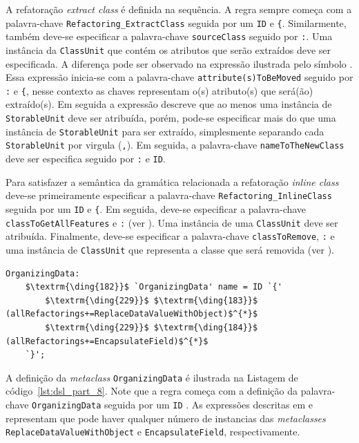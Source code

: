 A refatoração \textit{extract class} é definida na sequência. A regra sempre começa com a palavra-chave \texttt{Refactoring\_ExtractClass} seguida por um \texttt{ID} e \texttt{\{}. Similarmente, também deve-se especificar a palavra-chave \texttt{sourceClass} seguido por \texttt{:}. Uma instância da \texttt{ClassUnit} que contém os atributos que serão extraídos deve ser especificada. A diferença pode ser observado na expressão ilustrada pelo símbolo . Essa expressão inicia-se com a palavra-chave \texttt{attribute(s)ToBeMoved} seguido por \texttt{:} e \texttt{\{}, nesse contexto as chaves representam o(s) atributo(s) que será(ão) extraído(s). Em seguida a expressão descreve que ao menos uma instância de \texttt{StorableUnit} deve ser atribuída, porém, pode-se especificar mais do que uma instância de \texttt{StorableUnit}  para ser extraído, simplesmente separando cada \texttt{StorableUnit} por virgula (\texttt{,}). Em seguida, a palavra-chave \texttt{nameToTheNewClass} deve ser especifica seguido por \texttt{:} e \texttt{ID}.

Para satisfazer a semântica da gramática relacionada a refatoração \textit{inline class} deve-se primeiramente especificar a palavra-chave \texttt{Refactoring\_InlineClass} seguida por um \texttt{ID} e \texttt{\{}. Em seguida, deve-se especificar a palavra-chave \texttt{classToGetAllFeatures} e \texttt{:} (ver ). Uma instância de uma \texttt{ClassUnit} deve ser atribuída. Finalmente, deve-se especificar a palavra-chave \texttt{classToRemove}, \texttt{:} e uma instância de \texttt{ClassUnit} que representa a classe que será removida (ver ).

\begin{lstlisting}[language=Xtext, frame=single, basicstyle=\scriptsize, mathescape=true, label={lst:dsl_part_8}, caption={Gramática da DSL - parte 8}]
OrganizingData: 
	$\textrm{\ding{182}}$ `OrganizingData' name = ID `{'
		$\textrm{\ding{229}}$ $\textrm{\ding{183}}$ (allRefactorings+=ReplaceDataValueWithObject)$^{*}$
		$\textrm{\ding{229}}$ $\textrm{\ding{184}}$ (allRefactorings+=EncapsulateField)$^{*}$
	`}';
\end{lstlisting}
  
A definição da \textit{metaclass} \texttt{OrganizingData} é ilustrada na Listagem de código~\ref{lst:dsl_part_8}. Note que a  regra começa com a definição da palavra-chave \texttt{OrganizingData} seguida por um \texttt{ID} . As expressões descritas em  e  representam que pode haver qualquer número de instancias das \textit{metaclasses} \texttt{ReplaceDataValueWithObject} e \texttt{EncapsulateField}, respectivamente. 

